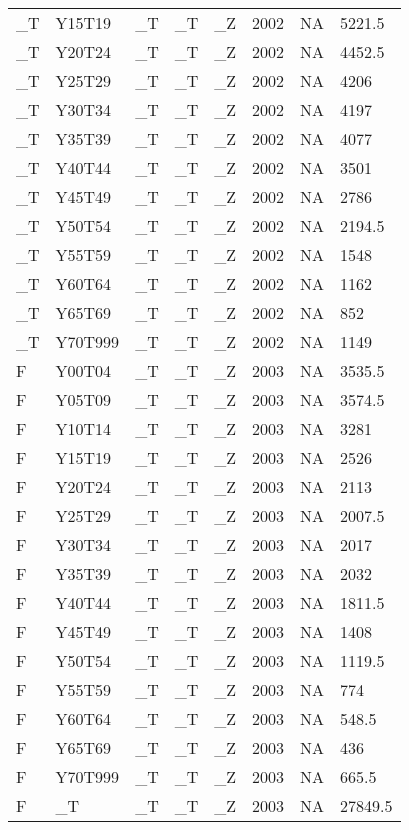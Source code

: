 \begin{longtable}[t]{llllllll}
\_T & Y15T19 & \_T & \_T & \_Z & 2002 & NA & 5221.5\\
\_T & Y20T24 & \_T & \_T & \_Z & 2002 & NA & 4452.5\\
\_T & Y25T29 & \_T & \_T & \_Z & 2002 & NA & 4206\\
\addlinespace
\_T & Y30T34 & \_T & \_T & \_Z & 2002 & NA & 4197\\
\_T & Y35T39 & \_T & \_T & \_Z & 2002 & NA & 4077\\
\_T & Y40T44 & \_T & \_T & \_Z & 2002 & NA & 3501\\
\_T & Y45T49 & \_T & \_T & \_Z & 2002 & NA & 2786\\
\_T & Y50T54 & \_T & \_T & \_Z & 2002 & NA & 2194.5\\
\addlinespace
\_T & Y55T59 & \_T & \_T & \_Z & 2002 & NA & 1548\\
\_T & Y60T64 & \_T & \_T & \_Z & 2002 & NA & 1162\\
\_T & Y65T69 & \_T & \_T & \_Z & 2002 & NA & 852\\
\_T & Y70T999 & \_T & \_T & \_Z & 2002 & NA & 1149\\
F & Y00T04 & \_T & \_T & \_Z & 2003 & NA & 3535.5\\
\addlinespace
F & Y05T09 & \_T & \_T & \_Z & 2003 & NA & 3574.5\\
F & Y10T14 & \_T & \_T & \_Z & 2003 & NA & 3281\\
F & Y15T19 & \_T & \_T & \_Z & 2003 & NA & 2526\\
F & Y20T24 & \_T & \_T & \_Z & 2003 & NA & 2113\\
F & Y25T29 & \_T & \_T & \_Z & 2003 & NA & 2007.5\\
\addlinespace
F & Y30T34 & \_T & \_T & \_Z & 2003 & NA & 2017\\
F & Y35T39 & \_T & \_T & \_Z & 2003 & NA & 2032\\
F & Y40T44 & \_T & \_T & \_Z & 2003 & NA & 1811.5\\
F & Y45T49 & \_T & \_T & \_Z & 2003 & NA & 1408\\
F & Y50T54 & \_T & \_T & \_Z & 2003 & NA & 1119.5\\
\addlinespace
F & Y55T59 & \_T & \_T & \_Z & 2003 & NA & 774\\
F & Y60T64 & \_T & \_T & \_Z & 2003 & NA & 548.5\\
F & Y65T69 & \_T & \_T & \_Z & 2003 & NA & 436\\
F & Y70T999 & \_T & \_T & \_Z & 2003 & NA & 665.5\\
F & \_T & \_T & \_T & \_Z & 2003 & NA & 27849.5\\

\end{longtable}
